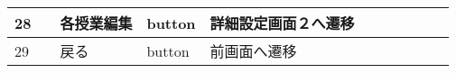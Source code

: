 \begin{landscape}
\begin{table}[]
\begin{tabular}{|l|l|l|l|l|l|l|l|l|l|l|}
28  &               & 各授業編集            & button   & 詳細設定画面２へ遷移                                                        &         &                       &                    &                 &                               &                                                                \\ \hline
29  &               & 戻る               & button   & 前画面へ遷移                                                            &         &                       &                    &                 &                               &                                                                \\ \hline
\end{tabular}
\end{table}




\end{landscape}
